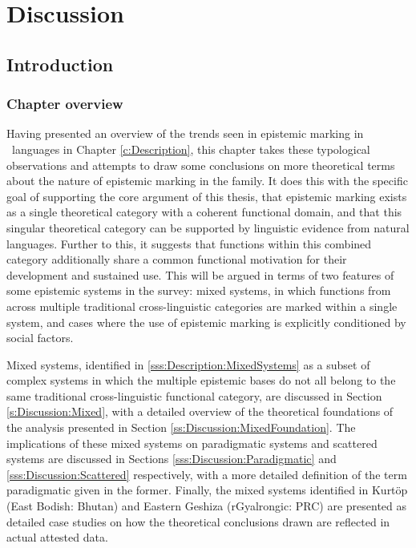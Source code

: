 \chapter{Discussion}\label{c:Discussion}
\section{Introduction}\label{s:Discussion:Introduction}
\subsection{Chapter overview}
Having presented an overview of the trends seen in epistemic marking in \lfam\ languages in Chapter \ref{c:Description}, this chapter takes these typological observations and attempts to draw some conclusions on more theoretical terms about the nature of epistemic marking in the family. It does this with the specific goal of supporting the core argument of this thesis, that epistemic marking exists as a single theoretical category with a coherent functional domain, and that this singular theoretical category can be supported by linguistic evidence from natural languages. Further to this, it suggests that functions within this combined category additionally share a common functional motivation for their development and sustained use. This will be argued in terms of two features of some epistemic systems in the survey: mixed systems, in which functions from across multiple traditional cross-linguistic categories are marked within a single system, and cases where the use of epistemic marking is explicitly conditioned by social factors.

Mixed systems, identified in \ref{sss:Description:MixedSystems} as a subset of complex systems in which the multiple epistemic bases do not all belong to the same traditional cross-linguistic functional category, are discussed in Section \ref{s:Discussion:Mixed}, with a detailed overview of the theoretical foundations of the analysis presented in Section \ref{ss:Discussion:MixedFoundation}. The implications of these mixed systems on paradigmatic systems and scattered systems are discussed in Sections \ref{sss:Discussion:Paradigmatic} and \ref{sss:Discussion:Scattered} respectively, with a more detailed definition of the term paradigmatic given in the former. Finally, the mixed systems identified in Kurtöp (East Bodish: Bhutan) and Eastern Geshiza (rGyalrongic: PRC) are presented as detailed case studies on how the theoretical conclusions drawn are reflected in actual attested data.

